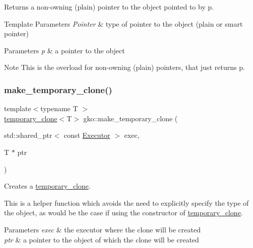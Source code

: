 Returns a non-\/owning (plain) pointer to the object pointed to by {\ttfamily p}. 


\begin{DoxyTemplParams}{Template Parameters}
{\em Pointer} & type of pointer to the object (plain or smart pointer)\\
\hline
\end{DoxyTemplParams}

\begin{DoxyParams}{Parameters}
{\em p} & a pointer to the object\\
\hline
\end{DoxyParams}
\begin{DoxyNote}{Note}
This is the overload for non-\/owning (plain) pointers, that just returns {\ttfamily p}. 
\end{DoxyNote}
\mbox{\label{namespacegko_aa9c0782fb35cc18cb404716d9b6f2c0e}} 
\subsubsection{\texorpdfstring{make\+\_\+temporary\+\_\+clone()}{make\_temporary\_clone()}}
{\footnotesize\ttfamily template$<$typename T $>$ \\
\hyperlink{classgko_1_1temporary__clone}{temporary\+\_\+clone}$<$T$>$ gko\+::make\+\_\+temporary\+\_\+clone (\begin{DoxyParamCaption}\item[{std\+::shared\+\_\+ptr$<$ const \hyperlink{classgko_1_1Executor}{Executor} $>$}]{exec,  }\item[{T $\ast$}]{ptr }\end{DoxyParamCaption})}



Creates a \hyperlink{classgko_1_1temporary__clone}{temporary\+\_\+clone}. 

This is a helper function which avoids the need to explicitly specify the type of the object, as would be the case if using the constructor of \hyperlink{classgko_1_1temporary__clone}{temporary\+\_\+clone}.


\begin{DoxyParams}{Parameters}
{\em exec} & the executor where the clone will be created \\
\hline
{\em ptr} & a pointer to the object of which the clone will be created \\
\hline
\end{DoxyParams}


